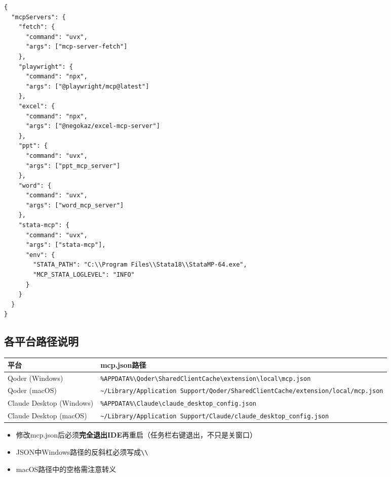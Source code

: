 \begin{lstlisting}[style=json]
{
  "mcpServers": {
    "fetch": {
      "command": "uvx",
      "args": ["mcp-server-fetch"]
    },
    "playwright": {
      "command": "npx",
      "args": ["@playwright/mcp@latest"]
    },
    "excel": {
      "command": "npx",
      "args": ["@negokaz/excel-mcp-server"]
    },
    "ppt": {
      "command": "uvx",
      "args": ["ppt_mcp_server"]
    },
    "word": {
      "command": "uvx",
      "args": ["word_mcp_server"]
    },
    "stata-mcp": {
      "command": "uvx",
      "args": ["stata-mcp"],
      "env": {
        "STATA_PATH": "C:\\Program Files\\Stata18\\StataMP-64.exe",
        "MCP_STATA_LOGLEVEL": "INFO"
      }
    }
  }
}
\end{lstlisting}

\subsection{各平台路径说明}

\begin{table}[H]
\centering
\begin{tabular}{ll}
\toprule
\textbf{平台} & \textbf{mcp.json路径} \\
\midrule
Qoder (Windows) & \texttt{\%APPDATA\%\textbackslash Qoder\textbackslash SharedClientCache\textbackslash extension\textbackslash local\textbackslash mcp.json} \\
Qoder (macOS) & \texttt{\textasciitilde/Library/Application Support/Qoder/SharedClientCache/extension/local/mcp.json} \\
Claude Desktop (Windows) & \texttt{\%APPDATA\%\textbackslash Claude\textbackslash claude\_desktop\_config.json} \\
Claude Desktop (macOS) & \texttt{\textasciitilde/Library/Application Support/Claude/claude\_desktop\_config.json} \\
\bottomrule
\end{tabular}
\end{table}

\begin{notebox}[路径注意]
\begin{itemize}[leftmargin=1em]
  \item 修改mcp.json后必须\textbf{完全退出IDE}再重启（任务栏右键退出，不只是关窗口）
  \item JSON中Windows路径的反斜杠必须写成\texttt{\textbackslash\textbackslash}
  \item macOS路径中的空格需注意转义
\end{itemize}
\end{notebox}

